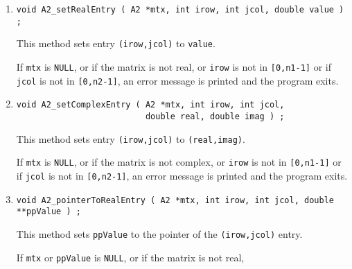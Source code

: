 \begin{enumerate}
\begin{verbatim}
void A2_complexEntry ( A2 *mtx, int irow, int jcol, 
                       double *pReal, double *pImag ) ;
\end{verbatim}
This method fills {\tt (*pReal,*pImag)} with the entry in 
location {\tt (irow, jcol)}.
\par {}
If {\tt mtx}, {\tt pReal} or {\tt pImag} is {\tt NULL},
or if the matrix is not complex,
or {\tt irow} is not in {\tt [0,n1-1]}, 
or if {\tt jcol} is not in {\tt [0,n2-1]},
an error message is printed and the program exits.
\item
\begin{verbatim}
void A2_setRealEntry ( A2 *mtx, int irow, int jcol, double value ) ;
\end{verbatim}
This method sets entry {\tt (irow,jcol)} to {\tt value}.
\par {}
If {\tt mtx} is {\tt NULL},
or if the matrix is not real,
or {\tt irow} is not in {\tt [0,n1-1]}
or if {\tt jcol} is not in {\tt [0,n2-1]},
an error message is printed and the program exits.
\item
\begin{verbatim}
void A2_setComplexEntry ( A2 *mtx, int irow, int jcol, 
                          double real, double imag ) ;
\end{verbatim}
This method sets entry {\tt (irow,jcol)} to {\tt (real,imag)}.
\par {}
If {\tt mtx} is {\tt NULL},
or if the matrix is not complex,
or {\tt irow} is not in {\tt [0,n1-1]}
or if {\tt jcol} is not in {\tt [0,n2-1]},
an error message is printed and the program exits.
\item
\begin{verbatim}
void A2_pointerToRealEntry ( A2 *mtx, int irow, int jcol, double **ppValue ) ;
\end{verbatim}
This method sets {\tt *ppValue} to the pointer 
of the {\tt (irow,jcol)} entry.
\par {}
If {\tt mtx} or {\tt ppValue} is {\tt NULL}, 
or if the matrix is not real,

\end{enumerate}
